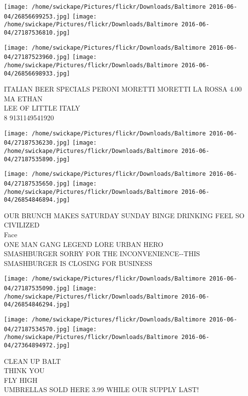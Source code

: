 \documentclass[10pt,letterpaper]{article}
\begin{document}
\texttt{[image: /home/swickape/Pictures/flickr/Downloads/Baltimore 2016-06-04/26856699253.jpg]}
\texttt{[image: /home/swickape/Pictures/flickr/Downloads/Baltimore 2016-06-04/27187536810.jpg]}

\texttt{[image: /home/swickape/Pictures/flickr/Downloads/Baltimore 2016-06-04/27187523960.jpg]}
\texttt{[image: /home/swickape/Pictures/flickr/Downloads/Baltimore 2016-06-04/26856698933.jpg]}

ITALIAN BEER SPECIALS PERONI MORETTI MORETTI LA ROSSA 4.00\\
MA ETHAN\\
LEE OF LITTLE ITALY\\
8 9131149541920\\
\pagebreak

\texttt{[image: /home/swickape/Pictures/flickr/Downloads/Baltimore 2016-06-04/27187536230.jpg]}
\texttt{[image: /home/swickape/Pictures/flickr/Downloads/Baltimore 2016-06-04/27187535890.jpg]}

\texttt{[image: /home/swickape/Pictures/flickr/Downloads/Baltimore 2016-06-04/27187535650.jpg]}
\texttt{[image: /home/swickape/Pictures/flickr/Downloads/Baltimore 2016-06-04/26854846894.jpg]}

OUR BRUNCH MAKES SATURDAY SUNDAY BINGE DRINKING FEEL SO CIVILIZED\\
Face\\
ONE MAN GANG LEGEND LORE URBAN HERO\\
SMASHBURGER SORRY FOR THE INCONVENIENCE{-}{-}THIS SMASHBURGER IS CLOSING FOR BUSINESS\\
\pagebreak

\texttt{[image: /home/swickape/Pictures/flickr/Downloads/Baltimore 2016-06-04/27187535090.jpg]}
\texttt{[image: /home/swickape/Pictures/flickr/Downloads/Baltimore 2016-06-04/26854846294.jpg]}

\texttt{[image: /home/swickape/Pictures/flickr/Downloads/Baltimore 2016-06-04/27187534570.jpg]}
\texttt{[image: /home/swickape/Pictures/flickr/Downloads/Baltimore 2016-06-04/27364894972.jpg]}

CLEAN UP BALT\\
THINK YOU\\
FLY HIGH\\
UMBRELLAS SOLD HERE 3.99 WHILE OUR SUPPLY LAST!\\
\pagebreak
\end{document}
